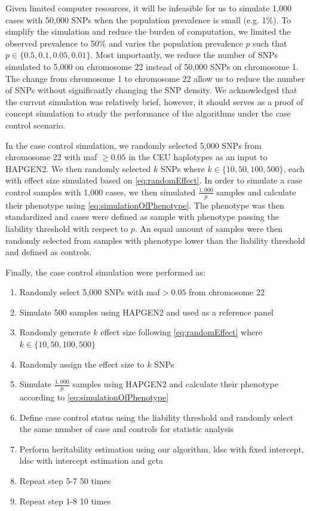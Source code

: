 \documentclass[12pt]{scrbook}
\begin{document}
Given limited computer resources, it will be infeasible for us to simulate 1,000 cases with 50,000 \glspl{SNP} when the population prevalence is small (e.g. 1\%).
To simplify the simulation and reduce the burden of computation, we limited the observed prevalence to 50\% and varies the population prevalence $p$ such that $p\in\{0.5, 0.1, 0.05, 0.01\}$.
Most importantly, we reduce the number of \glspl{SNP} simulated to 5,000 on chromosome 22 instead of 50,000 \glspl{SNP} on chromosome 1. 
The change from chromosome 1 to chromosome 22 allow us to reduce the number of \glspl{SNP} without significantly changing the \gls{SNP} density. 
We acknowledged that the current simulation was relatively brief, however, it should serves as a proof of concept simulation to study the performance of the algorithms under the case control scenario.

In the case control simulation, we randomly selected 5,000 \glspl{SNP} from chromosome 22 with \gls{maf} $\ge0.05$ in the \gls{CEU} haplotypes as an input to HAPGEN2. 
We then randomly selected $k$ \glspl{SNP} where $k\in\{10,50,100,500\}$, each with effect size simulated based on \cref{eq:randomEffect}.
In order to simulate a case control samples with 1,000 cases, we then simulated $\frac{1,000}{p}$ samples and calculate their phenotype using \cref{eq:simulationOfPhenotype}.
The phenotype was then standardized and cases were defined as sample with phenotype passing the liability threshold with respect to $p$.
An equal amount of samples were then randomly selected from samples with phenotype lower than the liability threshold and defined as controls.

Finally, the case control simulation were performed as:
\begin{enumerate}
	\item Randomly select 5,000 \glspl{SNP} with \gls{maf}$>0.05$ from chromosome 22
	\item Simulate 500 samples using HAPGEN2 and used as a reference panel
	\item Randomly generate $k$ effect size following \cref{eq:randomEffect} where $k\in\{10,50,100,500\}$
	\item Randomly assign the effect size to $k$ \glspl{SNP}
	\item Simulate $\frac{1,000}{p}$ samples using HAPGEN2 and calculate their phenotype according to \cref{eq:simulationOfPhenotype}
	\item Define case control status using the liability threshold and randomly select the same number of case and controls for statistic analysis
	\item Perform heritability estimation using our algorithm, \gls{ldsc} with fixed intercept, \gls{ldsc} with intercept estimation and \gls{gcta}
	\item Repeat step 5-7 50 times
	\item Repeat step 1-8 10 times
\end{enumerate}
\end{document}

